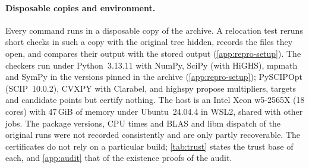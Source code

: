 \paragraph{Disposable copies and environment.}
Every command runs in a disposable copy of the archive.
A relocation test reruns short checks in such a copy with the original tree hidden, records the files they open, and compares their output with the stored output (\cref{app:repro-setup}).
The checkers run under Python~3.13.11 with NumPy, SciPy (with HiGHS), mpmath and SymPy in the versions pinned in the archive (\cref{app:repro-setup}); PySCIPOpt (SCIP~10.0.2), CVXPY with Clarabel, and highspy propose multipliers, targets and candidate points but certify nothing.
The host is an Intel Xeon w5-2565X (18 cores) with 47\,GiB of memory under Ubuntu~24.04.4 in WSL2, shared with other jobs.
The package versions, CPU times and BLAS and libm dispatch of the original runs were not recorded consistently and are only partly recoverable.
The certificates do not rely on a particular build; \cref{tab:trust} states the trust base of each, and \cref{app:audit} that of the existence proofs of the audit.
